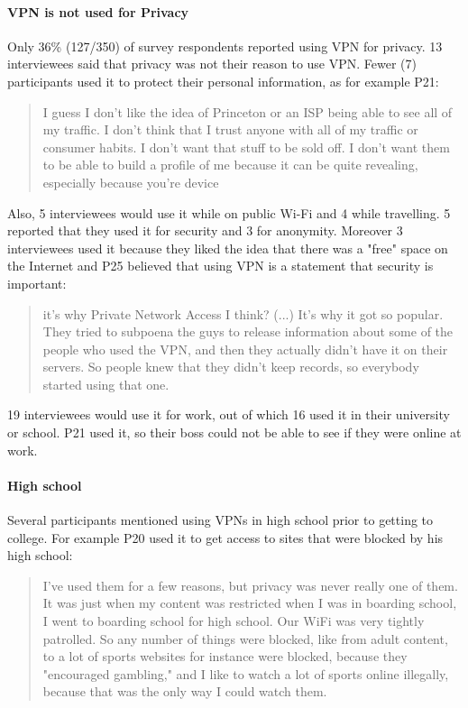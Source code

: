 \paragraph{VPN is not used for Privacy} Only 36\% (127/350) of survey respondents reported using VPN for privacy. 13 interviewees said that privacy was not
their reason to use VPN. Fewer (7) participants used it to protect their
personal information, as for example P21: \begin{quote}I guess I don't like
the idea of Princeton or an ISP being able to see all of my traffic. I don't
think that I trust anyone with all of my traffic or consumer habits. I don't
want that stuff to be sold off. I don't want them to be able to build a
profile of me because it can be quite revealing, especially because you're
device\end{quote} Also, 5 interviewees would use it while on public Wi-Fi and 4 while
travelling. 5 reported that they used it for security and 3 for anonymity.
Moreover 3 interviewees used it because they liked the idea that there was a
"free" space on the Internet and P25 believed that using VPN is a statement
that security is important:

\begin{quote}it's why Private Network Access I think? (...) It's why it got so
popular. They tried to subpoena the guys to release information about some of
the people who used the VPN, and then they actually didn't have it on their
servers. So people knew that they didn't keep records, so everybody started
using that one. \end{quote}


19 interviewees would use it for work, out of which 16 used it in their
university or school. P21 used it, so their boss could not be able to see if
they were online at work.

\paragraph{High school} Several participants mentioned using VPNs in high school prior to getting to college. For example P20 used it to get access to sites that were
blocked by his high school: 
\begin{quote}I've used them for a few reasons,
    but privacy was never really one of them. It was just when my content was
    restricted when I was in boarding school, I went to boarding
    school for high school. Our WiFi was very tightly patrolled. So any number
    of things were blocked, like from adult content, to a lot of sports
    websites for instance were blocked, because they "encouraged gambling,"
    and I like to watch a lot of sports online illegally, because that was the
    only way I could watch them.\end{quote}

